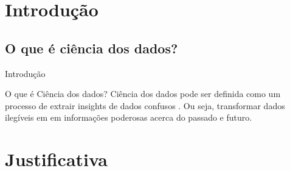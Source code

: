 
\section{Introdução}
	\subsection{O que é ciência dos dados?}
		\begin{frame}{Introdução}
			
			\begin{block}{O que é Ciência dos dados?}
				Ciência dos dados pode ser definida como um processo de extrair insights de dados confusos \cite{grus:2015} . Ou seja, transformar dados ilegíveis em em informações poderosas acerca do passado e futuro. 
			\end{block}
			
		\end{frame}

\section{Justificativa}
